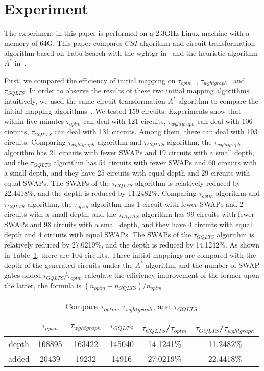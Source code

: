 \documentclass[runningheads]{llncs}
\begin{document}
\section{Experiment}
\label{Experiment}
The experiment in this paper is performed on a 2.3GHz Linux machine with a memory of 64G. This paper compares  $CSI$  algorithm 
and circuit transformation algorithm based on Tabu Search
with the wghtgr in~\cite{2020Qubit} and the heuristic algorithm $ A^{*}$  in~\cite{Zulehner2017}.
 
First, we compared the efficiency of initial mapping on $\tau_{optm}$~\cite{Zulehner2017}, $\tau_{wghtgraph}$~\cite{2020Qubit} and $\tau_{GQLTS}$.
In order to observe the results of these two initial mapping algorithms intuitively, 
we used the same circuit transformation $ A^{*}$ algorithm to compare the initial mapping algorithms~\cite{Zulehner2017}.
We tested 159 circuits. 
Experiments show that within five minutes $\tau_{optm}$ can deal with 121 circuits, 
$\tau_{wghtgraph}$  can deal with 106 circuits, $\tau_{GQLTS}$  can deal with  131 circuits.
Among them, there  can deal with  103 circuits.
Comparing $\tau_{wghtgraph}$ algorithm and $\tau_{GQLTS}$ algorithm, the $\tau_{wghtgraph}$ algorithm has 21 circuits with fewer SWAPs and 19 circuits with a small depth,
and the $\tau_{GQLTS}$ algorithm has 54 circuits with fewer SWAPs and 60 circuits with a small depth, 
and they have 25 circuits with equal depth and  29 circuits with equal SWAPs. 
The SWAPs of the $\tau_{GQLTS}$ algorithm is relatively reduced by 22.4418\%, and the depth is reduced by 11.2482\%.
Comparing $\tau_{optm}$ algorithm and $\tau_{GQLTS}$ algorithm, the $\tau_{optm}$ algorithm has 1 circuit with fewer SWAPs and 2 circuits with a small depth,
and the $\tau_{GQLTS}$ algorithm has 99 circuits with fewer SWAPs and 98 circuits with a small depth, 
and they have 4 circuits with equal depth and  4 circuits with equal SWAPs.
The SWAPs of the $\tau_{GQLTS}$ algorithm is relatively reduced by 27.0219\%, and the depth is reduced by 14.1242\%.
As shown in Table~\ref{tab1}, there are 104 circuits. 
Three initial mappings are compared with the depth of the generated circuits under the $A^{*}$ algorithm 
and the number of SWAP gates added.$\tau_{GQLTS}$/$\tau_{optm}$  calculate the efficiency improvement
 of the former upon the latter, the formula is $(n_{optm}-n_{GQLTS})/n_{optm}$.
\begin{table}
	\begin{center}  
	\begin{tabular}{|c|c|c|c|c|c|}
	\hline
	    	&  $\tau_{optm}$ & $\tau_{wghtgraph}$ &$\tau_{GQLTS}$& $\tau_{GQLTS}$/$\tau_{optm}$ & $\tau_{GQLTS}$/$\tau_{wghtgraph}$\\
	\hline
	 depth 	 &	168895	&   163422	&  145040 	& 14.1241\%  &11.2482\%   \\
	\hline
	 added 	&	20439	&  19232 	&  14916 & 27.0219\% 	&  22.4418\%  \\
	\hline
	\end{tabular} 
	\end{center} 
	\caption{Compare $\tau_{optm}$, $\tau_{wghtgraph}$, and $\tau_{GQLTS}$ }
	\label{tab1}
	\end{table}
\end{document}
